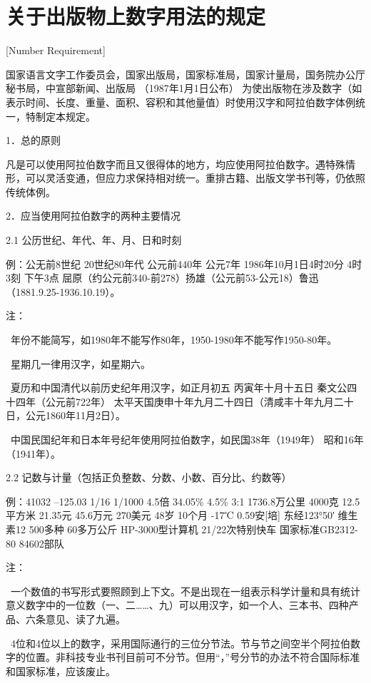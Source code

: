 \chapter{关于出版物上数字用法的规定}[Number Requirement]

国家语言文字工作委员会，国家出版局，国家标准局，国家计量局，国务院办公厅秘书局，中宣部新闻、出版局
（1987年1月1日公布）
为使出版物在涉及数字（如表示时间、长度、重量、面积、容积和其他量值）时使用汉字和阿拉伯数字体例统一，特制定本规定。

1．总的原则

凡是可以使用阿拉伯数字而且又很得体的地方，均应使用阿拉伯数字。遇特殊情形，可以灵活变通，但应力求保持相对统一。重排古籍、出版文学书刊等，仍依照传统体例。

2．应当使用阿拉伯数字的两种主要情况

2.1  公历世纪、年代、年、月、日和时刻

例：公无前8世纪  20世纪80年代  公元前440年  公元7年  1986年10月1日4时20分  4时3刻  下午3点  屈原（约公元前340-前278）扬雄（公元前53-公元18）鲁迅（1881.9.25-1936.10.19）。

注：

~年份不能简写，如1980年不能写作80年，1950-1980年不能写作1950-80年。

~星期几一律用汉字，如星期六。

~夏历和中国清代以前历史纪年用汉字，如正月初五  丙寅年十月十五日  秦文公四十四年（公元前722年）  太平天国庚申十年九月二十四日（清咸丰十年九月二十日，公元1860年11月2日）。

~中国民国纪年和日本年号纪年使用阿拉伯数字，如民国38年（1949年）  昭和16年（1941年）。

2.2  记数与计量（包括正负整数、分数、小数、百分比、约数等）

例：41032 –125.03  1/16  1/1000  4.5倍  34.05\%  4.5\%  3:1  1736.8万公里  4000克  12.5平方米  21.35元  45.6万元  270美元  48岁  10个月  -17℃  0.59安[培]  东经123°50′  维生素12  500多种  60多万公斤  HP-3000型计算机  21/22次特别快车  国家标准GB2312-80  84602部队

注：

~一个数值的书写形式要照顾到上下文。不是出现在一组表示科学计量和具有统计意义数字中的一位数（一、二……、九）可以用汉字，如一个人、三本书、四种产品、六条意见、读了九遍。

~4位和4位以上的数字，采用国际通行的三位分节法。节与节之间空半个阿拉伯数字的位置。非科技专业书刊目前可不分节。但用“，”号分节的办法不符合国际标准和国家标准，应该废止。

